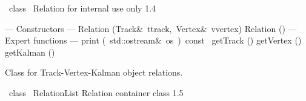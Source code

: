 \documentclass{article}
\begin{document}
\begin{cxxentry}
\begin{cxxclass}
\begin{cxxdoc}
\end{cxxdoc}
\end{cxxclass}
\begin{cxxclass}
{\ class\ }
        {Relation}
        {}
        {for internal use only}
        {1.4}
\begin{cxxpublic}
\cxxitem{}
        {--- Constructors --- }
        {}
        {}
        {}
\label{cxx.1.4.1}
\cxxitem{}
        {Relation}
        {(Track\&\ ttrack,\ Vertex\&\ vvertex)}
        {}
        {}
\label{cxx.1.4.2}
\cxxitem{}
        {\cxxtilde Relation}
        {()}
        {}
        {}
\label{cxx.1.4.3}
\cxxitem{}
        {--- Expert functions --- }
        {}
        {}
        {}
\label{cxx.1.4.4}
        {print}
        {(\ std::ostream\&\ os\ )\ const\ }
        {}
        {}
\label{cxx.1.4.5}
        {getTrack}
        {()}
        {}
        {}
\label{cxx.1.4.6}
        {getVertex}
        {()}
        {}
        {}
\label{cxx.1.4.7}
        {getKalman}
        {()}
        {}
        {}
\label{cxx.1.4.8}
\end{cxxpublic}
\begin{cxxdoc}
Class for Track-Vertex-Kalman object relations.

\end{cxxdoc}
\end{cxxclass}
\begin{cxxclass}
{\ class\ }
        {RelationList}
        {}
        {Relation container class }
        {1.5}
\begin{cxxInheritance}

\end{cxxInheritance}
\end{cxxclass}
\end{cxxentry}
\end{document}
